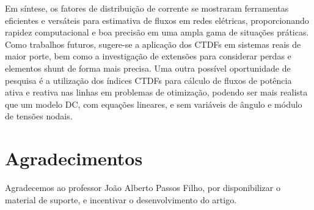 \documentclass[journal]{IEEEtran}
\begin{document}
Em síntese, os fatores de distribuição de corrente se mostraram ferramentas eficientes e versáteis para estimativa de fluxos em redes elétricas, proporcionando rapidez computacional e boa precisão em uma ampla gama de situações práticas.  Como trabalhos futuros, sugere-se a aplicação dos CTDFs em sistemas reais de maior porte, bem como a investigação de extensões para considerar perdas e elementos shunt de forma mais precisa.
Uma outra possível oportunidade de pesquisa é a utilização dos índices CTDFs para cálculo de fluxos de potência ativa e reativa nas linhas em problemas de otimização, podendo ser mais realista que um modelo DC, com equações lineares, e sem variáveis de ângulo e módulo de tensões nodais.
\section*{Agradecimentos}
Agradecemos ao professor João Alberto Passos Filho, por disponibilizar o material de suporte, e incentivar o desenvolvimento do artigo. 









 
\end{document}
